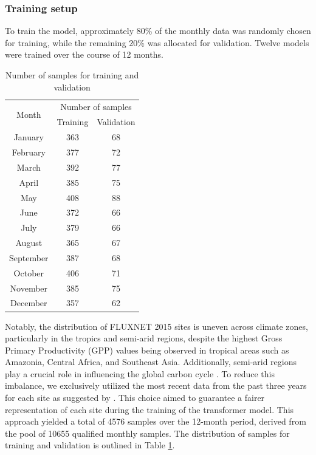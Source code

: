 \subsubsection{Training setup}
To train the model, approximately 80\% of the monthly data was randomly chosen for training, while the remaining 20\% was allocated for validation. Twelve models were trained over the course of 12 months. \par
\begin{table}[!ht]
    \centering
    \caption{Number of samples for training and validation}
    \begin{tabular}{ccc}
        \hline
        \multirow{2}{*}{Month} & \multicolumn{2}{c}{Number of samples} \\ \cline{2-3}
        ~ & Training & Validation \\ \hline
        January & 363 & 68 \\ 
        February & 377 & 72 \\ 
        March & 392 & 77 \\ 
        April & 385 & 75 \\ 
        May & 408 & 88 \\ 
        June & 372 & 66 \\ 
        July & 379 & 66 \\ 
        August & 365 & 67 \\ 
        September & 387 & 68 \\ 
        October & 406 & 71 \\ 
        November & 385 & 75 \\ 
        December & 357 & 62 \\ \hline
    \end{tabular}
    \label{tab:chap6_nosamples}
\end{table}

Notably, the distribution of FLUXNET 2015 sites is uneven across climate zones, particularly in the tropics and semi-arid regions, despite the highest Gross Primary Productivity (GPP) values being observed in tropical areas such as Amazonia, Central Africa, and Southeast Asia\citep{chen2017regional}. Additionally, semi-arid regions play a crucial role in influencing the global carbon cycle \citep{poulter2014contribution}. To reduce this imbalance, we exclusively utilized the most recent data from the past three years for each site as suggested by \citep{zeng2020global}. This choice aimed to guarantee a fairer representation of each site during the training of the transformer model. This approach yielded a total of 4576 samples over the 12-month period, derived from the pool of 10655 qualified monthly samples. The distribution of samples for training and validation is outlined in Table \ref{tab:chap6_nosamples}. \par
